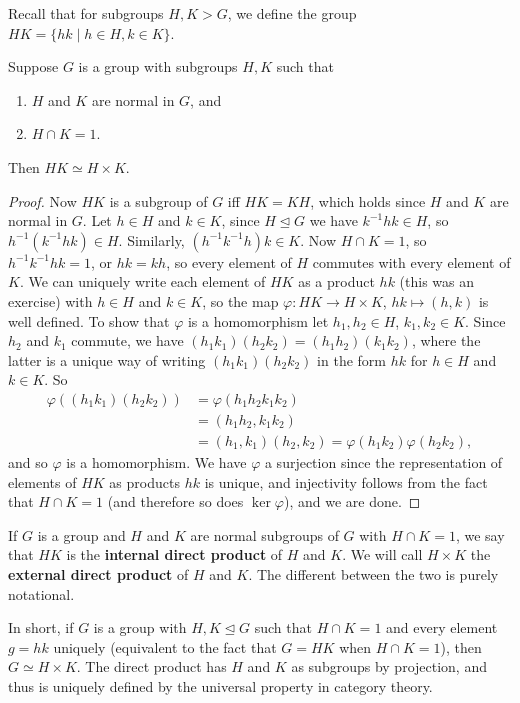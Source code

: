 Recall that for subgroups $H,K>G$, we define the group $HK=\{hk \mid h\in H,k\in K\} $.
\begin{theorem}
    Suppose $G$ is a group with subgroups $H,K$ such that
    \begin{enumerate}[label=(\arabic*)]
        \item $H$ and $K$ are normal in $G$, and
        \item $H\cap K=1$.
    \end{enumerate}
    Then $HK\simeq H\times K$.
\end{theorem}
\begin{proof}
    Now $HK$ is a subgroup of $G$ iff $HK=KH$, which holds since $H$ and $K$ are normal in $G$. Let $h\in H$ and $k\in K$, since $H\trianglelefteq G$ we have $k^{-1}hk\in H$, so $h^{-1}(k^{-1}hk)\in H$. Similarly, $(h^{-1}k^{-1}h)k\in K$. Now $H\cap K=1$, so $h^{-1}k^{-1}hk=1$, or $hk=kh$, so every element of $H$ commutes with every element of $K$. We can uniquely write each element of $HK$ as a product $hk$ (this was an exercise) with $h\in H$ and $k\in K$, so the map $\varphi \colon HK \to H\times K$, $hk\mapsto (h,k)$ is well defined. To show that $\varphi $ is a homomorphism let $h_1,h_2\in H$, $k_1,k_2\in K$. Since $h_2$ and $k_1$ commute, we have $(h_1k_1)(h_2k_2)=(h_1h_2)(k_1k_2)$, where the latter is a unique way of writing $(h_1k_1)(h_2k_2)$ in the form $h k$ for $h\in H$ and $k\in K$. So 
    \begin{align*}
        \varphi ((h_1k_1)(h_2k_2))&=\varphi (h_1h_2k_1k_2)\\
                                  &=(h_1h_2,k_1k_2)\\
                                  &=(h_1,k_1)(h_2,k_2)=\varphi (h_1k_2)\varphi (h_2k_2),
    \end{align*} and so $\varphi $ is a homomorphism. We have $\varphi $ a surjection since the representation of elements of $HK$ as products $hk$ is unique, and injectivity follows from the fact that $H\cap K=1$ (and therefore so does $\ker \varphi $), and we are done.
\end{proof}
\begin{definition}[]
    If $G$ is a group and $H$ and $K$ are normal subgroups of $G$ with $H\cap K=1$, we say that $HK$ is the \textbf{internal direct product} of $H$ and $K$. We will call $H\times K$ the \textbf{external direct product} of $H$ and $K$. The different between the two is purely notational.
\end{definition}
In short, if $G$ is a group with $H,K\trianglelefteq G$ such that $H\cap K=1$ and every element $g=hk$ uniquely (equivalent to the fact that $G=HK$ when $H\cap K=1$), then $G\simeq H\times K$. The direct product has $H$ and $K$ as subgroups by projection, and thus is uniquely defined by the universal property in category theory.

